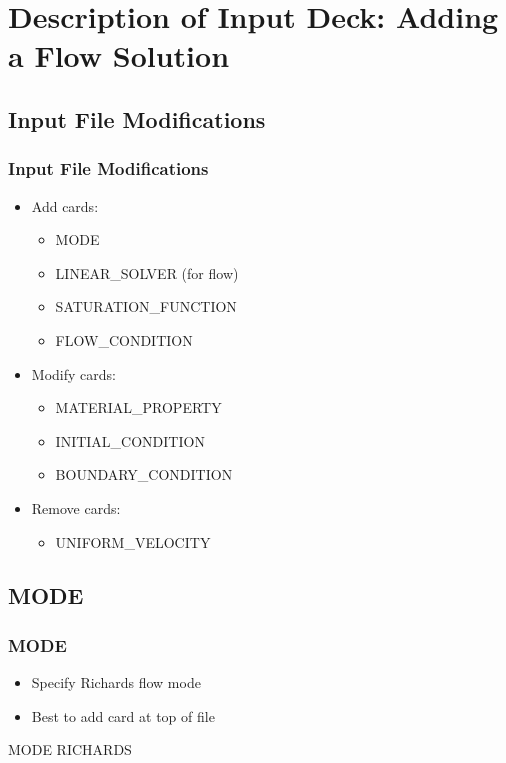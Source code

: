 \documentclass{beamer}
\begin{document}
\section{Description of Input Deck: Adding a Flow Solution}

\subsection{Input File Modifications}

\begin{frame}[fragile]\frametitle{Input File Modifications}

\begin{itemize}
\item Add cards:
  \begin{itemize}
    \item MODE
    \item LINEAR\_SOLVER (for flow)
    \item SATURATION\_FUNCTION
    \item FLOW\_CONDITION
  \end{itemize}
\item Modify cards:
  \begin{itemize}
    \item MATERIAL\_PROPERTY
    \item INITIAL\_CONDITION
    \item BOUNDARY\_CONDITION
   \end{itemize}
\item Remove cards:
  \begin{itemize}
    \item UNIFORM\_VELOCITY
  \end{itemize}  
\end{itemize}

\end{frame}

\subsection{MODE}

\begin{frame}[fragile]\frametitle{MODE}

\begin{itemize}
\item Specify Richards flow mode
\item Best to add card at top of file
\end{itemize}


\begin{semiverbatim}

MODE RICHARDS
\end{semiverbatim}

\end{frame}
\end{document}
